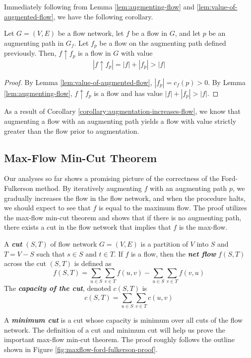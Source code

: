 Immediately following from Lemma \ref{lem:augmenting-flow} and \ref{lem:value-of-augmented-flow}, we have the following corollary.

\begin{corollary} \label{corollary:augmentation-increases-flow}
    Let $G=(V,E)$ be a flow network, let $f$ be a flow in $G$, and let $p$ be an augmenting path in $G_f$. Let $f_p$ be a flow on the augmenting path defined previously. Then, $f \uparrow f_p$ is a flow in $G$ with value
    $$
    |f \uparrow f_p| = |f| + |f_p| > |f|
    $$
\end{corollary}

\begin{proof}
    By Lemma \ref{lem:value-of-augmented-flow}, $|f_p| = c_f(p) > 0$. By Lemma \ref{lem:augmenting-flow}, $f \uparrow f_p$ is a flow and has value $|f|+|f_p| > |f|$.
\end{proof}

As a result of Corollary \ref{corollary:augmentation-increases-flow}, we know that augmenting a flow with an augmenting path yields a flow with value strictly greater than the flow prior to augmentation.

\subsection{Max-Flow Min-Cut Theorem}

Our analyses so far shows a promising picture of the correctness of the Ford-Fulkerson method. By iteratively augmenting $f$ with an augmenting path $p$, we gradually increases the flow in the flow network, and when the procedure halts, we should expect to see that $f$ is equal to the maximum flow. The proof utilizes the max-flow min-cut theorem and shows that if there is no augmenting path, there exists a cut in the flow network that implies that $f$ is the max-flow.

\begin{definition}  
    A \textit{\textbf{cut}} $(S,T)$ of flow network $G=(V,E)$ is a partition of $V$ into $S$ and $T=V-S$ such that $s \in S$ and $t \in T$. If $f$ is a flow, then the \textit{\textbf{net flow}} $f(S,T)$ across the cut $(S,T)$ is defined as
    $$
    f(S,T) = \sum_{u \in S}\sum_{v \in T} f(u,v) - \sum_{u \in S}\sum_{v \in T} f(v,u)
    $$
    The \textit{\textbf{capacity of the cut}}, denoted $c(S,T)$ is
    $$
    c(S,T) = \sum_{u \in S}\sum_{v \in T} c(u,v)
    $$
\end{definition}
A \textit{\textbf{minimum cut}} is a cut whose capacity is minimum over all cuts of the flow network. The definition of a cut and minimum cut will help us prove the important max-flow min-cut theorem. The proof roughly follows the outline shown in Figure \ref{fig:maxflow-ford-fulkerson-proof}.


